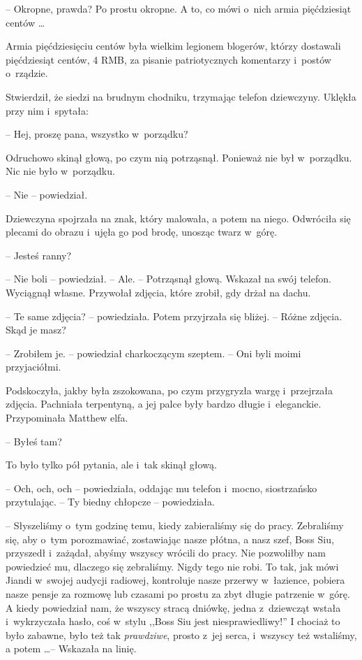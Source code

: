\documentclass[oneside,polish,11pt,rmheadings]{mwbk}
\begin{document}
-- Okropne, prawda? Po prostu okropne. A to, co mówi o~nich armia pięćdziesiąt centów \ldots  

Armia pięćdziesięciu centów była wielkim legionem blogerów, którzy dostawali pięćdziesiąt centów, 4 RMB, za pisanie patriotycznych komentarzy i~postów o~rządzie.

Stwierdził, że siedzi na brudnym chodniku, trzymając telefon dziewczyny. Uklękła przy nim i~spytała: 

-- Hej, proszę pana, wszystko w~porządku?

Odruchowo skinął głową, po czym nią potrząsnął. Ponieważ nie był w~porządku. Nic nie było w~porządku. 

-- Nie -- powiedział.

Dziewczyna spojrzała na znak, który malowała, a potem na niego. Odwróciła się plecami do obrazu i~ujęła go pod brodę, unosząc twarz w~górę. 

-- Jesteś ranny? 

-- Nie boli -- powiedział. -- Ale. -- Potrząsnął głową. Wskazał na swój telefon. Wyciągnął własne. Przywołał zdjęcia, które zrobił, gdy drżał na dachu.

-- Te same zdjęcia? -- powiedziała. Potem przyjrzała się bliżej. -- Różne zdjęcia. Skąd je masz? 

-- Zrobiłem je. -- powiedział charkoczącym szeptem. -- Oni byli moimi przyjaciółmi. 

Podskoczyła, jakby była zszokowana, po czym przygryzła wargę i~przejrzała zdjęcia. Pachniała terpentyną, a jej palce były bardzo długie i~eleganckie. Przypominała Matthew elfa. 

-- Byłeś tam? 

To było tylko pół pytania, ale i~tak skinął głową. 


-- Och, och, och -- powiedziała, oddając mu telefon i~mocno, siostrzańsko przytulając. -- Ty biedny chłopcze -- powiedziała.

-- Słyszeliśmy o~tym godzinę temu, kiedy zabieraliśmy się do pracy. Zebraliśmy się, aby o~tym porozmawiać, zostawiając nasze płótna, a nasz szef, Boss Siu, przyszedł i~zażądał, abyśmy wszyscy wrócili do pracy. Nie pozwoliłby nam powiedzieć mu, dlaczego się zebraliśmy. Nigdy tego nie robi. To tak, jak mówi Jiandi w~swojej audycji radiowej, kontroluje nasze przerwy w~łazience, pobiera nasze pensje za rozmowę lub czasami po prostu za zbyt długie patrzenie w~górę. A kiedy powiedział nam, że wszyscy stracą dniówkę, jedna z~dziewcząt wstała i~wykrzyczała hasło, coś w~stylu ,,Boss Siu jest niesprawiedliwy!'' I chociaż to było zabawne, było też tak \textit{prawdziwe}, prosto z~jej serca, i~wszyscy też wstaliśmy, a potem \ldots  -- Wskazała na linię.
\end{document}
